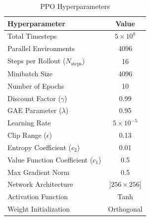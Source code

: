 \documentclass[preprint,12pt]{elsarticle}
\begin{document}
\begin{table}[!htbp]
\centering
\caption{PPO Hyperparameters}
\label{tab:ppo_hyperparams}
\footnotesize
\renewcommand{\arraystretch}{1.0}
\setlength{\tabcolsep}{4pt}
\begin{tabular}{lc}
\toprule
\textbf{Hyperparameter} & \textbf{Value} \\
\midrule
Total Timesteps & $5\times 10^8$\\
Parallel Environments & 4096 \\
Steps per Rollout ($N_\text{steps}$) & 16 \\
Minibatch Size & 4096 \\
Number of Epochs & 10 \\
Discount Factor ($\gamma$) & 0.99 \\
GAE Parameter ($\lambda$) & 0.95 \\
Learning Rate & $5 \times 10^{-5}$\\
Clip Range ($\epsilon$) & 0.13 \\
Entropy Coefficient ($c_2$) & 0.01 \\
Value Function Coefficient ($c_1$) & 0.5 \\
Max Gradient Norm & 0.5 \\
Network Architecture & [$256 \times 256$]\\
Activation Function & Tanh \\
Weight Initialization & Orthogonal \\
\bottomrule
\end{tabular}
\end{table}
\end{document}
